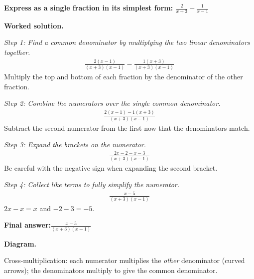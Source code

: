 \documentclass[11pt]{article}
\newcommand{\question}[1]{\par\medskip\noindent\textbf{#1}\par}
\begin{document}
\question{Express as a single fraction in its simplest form: \( \frac{2}{x+3} - \frac{1}{x-1} \)}

\textbf{Worked solution.}

\textit{Step 1: Find a common denominator by multiplying the two linear denominators together.}
\[\begin{gathered}
\frac{2(x-1)}{(x+3)(x-1)} - \frac{1(x+3)}{(x+3)(x-1)}
\end{gathered}\]
Multiply the top and bottom of each fraction by the denominator of the other fraction.

\textit{Step 2: Combine the numerators over the single common denominator.}
\[\begin{gathered}
\frac{2(x-1) - 1(x+3)}{(x+3)(x-1)}
\end{gathered}\]
Subtract the second numerator from the first now that the denominators match.

\textit{Step 3: Expand the brackets on the numerator.}
\[\begin{gathered}
\frac{2x - 2 - x - 3}{(x+3)(x-1)}
\end{gathered}\]
Be careful with the negative sign when expanding the second bracket.

\textit{Step 4: Collect like terms to fully simplify the numerator.}
\[\begin{gathered}
\frac{x - 5}{(x+3)(x-1)}
\end{gathered}\]
\( 2x - x = x \) and \( -2 - 3 = -5 \).

\begin{answerbox}
\textbf{Final answer:}\quad \(\displaystyle \frac{x - 5}{(x+3)(x-1)}\)
\end{answerbox}
\textbf{Diagram.}

\begin{center}
\end{center}
\small Cross-multiplication: each numerator multiplies the \emph{other} denominator (curved arrows); the denominators multiply to give the common denominator.\normalsize
\end{document}
